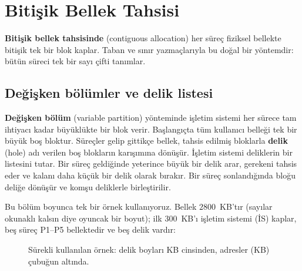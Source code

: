\documentclass[11pt,a4paper]{article}
\newcommand{\term}[1]{\textbf{\color{mintdeep}#1}}
\begin{document}
\section{Bitişik Bellek Tahsisi}
\label{sec:contig}

\term{Bitişik bellek tahsisinde} (contiguous allocation) her süreç fiziksel bellekte bitişik tek bir blok kaplar. Taban ve sınır yazmaçlarıyla bu doğal bir yöntemdir: bütün süreci tek bir sayı çifti tanımlar.

\subsection{Değişken bölümler ve delik listesi}

\term{Değişken bölüm} (variable partition) yönteminde işletim sistemi her sürece tam ihtiyacı kadar büyüklükte bir blok verir. Başlangıçta tüm kullanıcı belleği tek bir büyük boş bloktur. Süreçler gelip gittikçe bellek, tahsis edilmiş bloklarla \term{delik} (hole) adı verilen boş blokların karışımına dönüşür. İşletim sistemi deliklerin bir listesini tutar. Bir süreç geldiğinde yeterince büyük bir delik arar, gerekeni tahsis eder ve kalanı daha küçük bir delik olarak bırakır. Bir süreç sonlandığında bloğu deliğe dönüşür ve komşu deliklerle birleştirilir.

Bu bölüm boyunca tek bir örnek kullanıyoruz. Bellek $2800$~KB'tır (sayılar okunaklı kalsın diye oyuncak bir boyut); ilk $300$~KB'ı işletim sistemi (İS) kaplar, beş süreç P1--P5 bellektedir ve beş delik vardır:

\begin{figure}[H]
\centering
{}
\caption{Sürekli kullanılan örnek: delik boyları KB cinsinden, adresler (KB) çubuğun altında.}
\end{figure}
\end{document}
